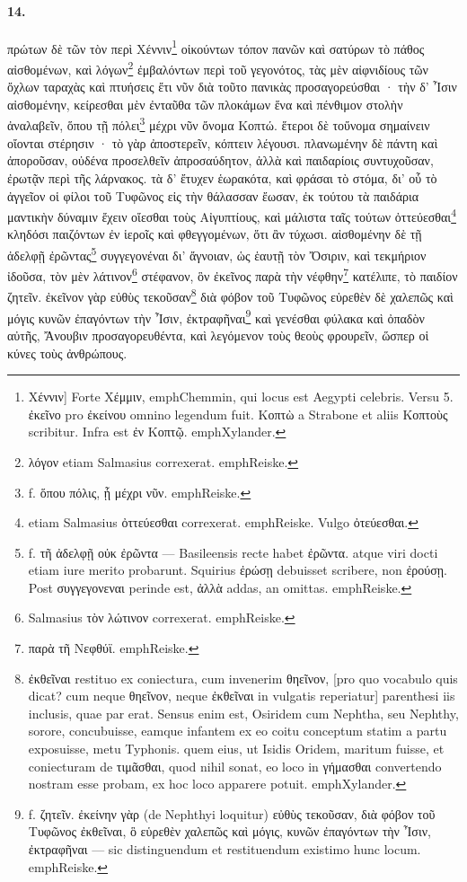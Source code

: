 \documentclass[a4paper, 11pt, oneside, polutonikogreek, german]{article}
\begin{document}
\paragraph{14.}
πρώτων δὲ τῶν τὸν περὶ Χέννιν\footnote{Χέννιν] Forte Χέμμιν, emph{Chemmin}, qui locus est Aegypti celebris. Versu 5. ἐκεῖνο pro ἐκείνου omnino legendum fuit. Κοπτὼ a Strabone et aliis Κοπτοὺς scribitur. Infra est ἐν Κοπτῷ. emph{Xylander.}} οἰκούντων τόπον πανῶν καὶ σατύρων τὸ πάθος αἰσθομένων, καὶ λόγων\footnote{λόγον etiam Salmasius correxerat. emph{Reiske.}} ἐμβαλόντων περὶ τοῦ γεγονότος, τὰς μὲν αἰφνιδίους τῶν ὄχλων ταραχὰς καὶ πτυήσεις ἔτι νῦν διὰ τοῦτο πανικὰς προσαγορεύσθαι · τὴν δ' Ἶσιν αἰσθομένην, κείρεσθαι μὲν ἐνταῦθα τῶν πλοκάμων ἕνα καὶ πένθιμον στολὴν ἀναλαβεῖν, ὅπου τῇ πόλει\footnote{f. ὅπου πόλις, ᾗ μέχρι νῦν. emph{Reiske.}} μέχρι νῦν ὄνομα Κοπτώ. ἕτεροι δὲ τοὔνομα σημαίνειν οἴονται στέρησιν · τὸ γὰρ ἀποστερεῖν, κόπτειν λέγουσι. πλανωμένην δὲ πάντη καὶ ἀποροῦσαν, οὐδένα προσελθεῖν ἀπροσαύδητον, ἀλλὰ καὶ παιδαρίοις συντυχοῦσαν, ἐρωτᾷν περὶ τῆς λάρνακος. τὰ δ' ἔτυχεν ἑωρακότα, καὶ φράσαι τὸ στόμα, δι' οὗ τὸ ἀγγεῖον οἱ φίλοι τοῦ Τυφῶνος εἰς τὴν θάλασσαν ἔωσαν, ἐκ τούτου τὰ παιδάρια μαντικὴν δύναμιν ἔχειν οἴεσθαι τοὺς Αἰγυπτίους, καὶ μάλιστα ταῖς τούτων ὀττεύεσθαι\footnote{etiam Salmasius ὀττεύεσθαι correxerat. emph{Reiske.} Vulgo ὀτεύεσθαι.} κληδόσι παιζόντων ἐν ἱεροῖς καὶ φθεγγομένων, ὅτι ἂν τύχωσι. αἰσθομένην δὲ τῇ ἀδελφῇ ἐρῶντας\footnote{f. τῆ ἀδελφῇ οὐκ ἐρῶντα --- Basileensis recte habet ἐρῶντα. atque viri docti etiam iure merito probarunt. Squirius ἐρώσῃ debuisset scribere, non ἐρούσῃ. Post συγγεγονεναι perinde est, ἀλλὰ addas, an omittas. emph{Reiske.}} συγγεγονέναι δι' ἄγνοιαν, ὡς ἑαυτῇ τὸν Ὄσιριν, καὶ τεκμήριον ἰδοῦσα, τὸν μὲν λάτινον\footnote{Salmasius τὸν λώτινον correxerat. emph{Reiske.}} στέφανον, ὃν ἐκεῖνος παρὰ τὴν νέφθην\footnote{παρὰ τῆ Νεφθύϊ. emph{Reiske.}} κατέλιπε, τὸ παιδίον ζητεῖν. ἐκεῖνον γὰρ εὐθὺς τεκοῦσαν\footnote{ἐκθεῖναι restituo ex coniectura, cum invenerim θηεῖνον, [pro quo vocabulo quis dicat? cum neque θηεῖνον, neque ἐκθεῖναι in vulgatis reperiatur] parenthesi iis inclusis, quae par erat. Sensus enim est, Osiridem cum Nephtha, seu Nephthy, sorore, concubuisse, eamque infantem ex eo coitu conceptum statim a partu exposuisse, metu Typhonis. quem eius, ut Isidis Oridem, maritum fuisse, et coniecturam de τιμᾶσθαι, quod nihil sonat, eo loco in γήμασθαι convertendo nostram esse probam, ex hoc loco apparere potuit. emph{Xylander.}} διὰ φόβον τοῦ Τυφῶνος εὑρεθὲν δὲ χαλεπῶς καὶ μόγις κυνῶν ἐπαγόντων τὴν Ἶσιν, ἐκτραφῆναι\footnote{f. ζητεῖν. ἐκείνην γὰρ (de Nephthyi loquitur) εὐθὺς τεκοῦσαν, διὰ φόβον τοῦ Τυφῶνος ἐκθεῖναι, ὃ εὑρεθὲν χαλεπῶς καὶ μόγις, κυνῶν ἐπαγόντων τὴν Ἶσιν, ἐκτραφῆναι --- sic distinguendum et restituendum existimo hunc locum. emph{Reiske.}} καὶ γενέσθαι φύλακα καὶ ὀπαδὸν αὐτῆς, Ἄνουβιν προσαγορευθέντα, καὶ λεγόμενον τοὺς θεοὺς φρουρεῖν, ὥσπερ οἱ κύνες τοὺς ἀνθρώπους.
\end{document}
